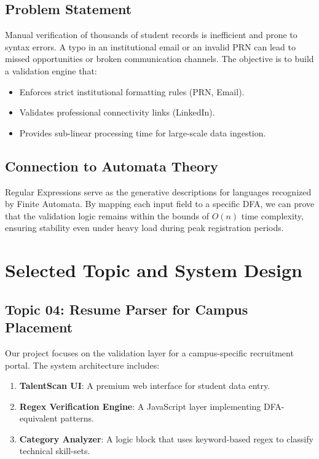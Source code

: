 \documentclass[12pt,a4paper]{article}
\begin{document}
\subsection{Problem Statement}
Manual verification of thousands of student records is inefficient and prone to syntax errors. A typo in an institutional email or an invalid PRN can lead to missed opportunities or broken communication channels. The objective is to build a validation engine that:
\begin{itemize}
    \item Enforces strict institutional formatting rules (PRN, Email).
    \item Validates professional connectivity links (LinkedIn).
    \item Provides sub-linear processing time for large-scale data ingestion.
\end{itemize}

\subsection{Connection to Automata Theory}
Regular Expressions serve as the generative descriptions for languages recognized by Finite Automata. By mapping each input field to a specific DFA, we can prove that the validation logic remains within the bounds of $O(n)$ time complexity, ensuring stability even under heavy load during peak registration periods.

\newpage

\section{Selected Topic and System Design}

\subsection{Topic 04: Resume Parser for Campus Placement}
Our project focuses on the validation layer for a campus-specific recruitment portal. The system architecture includes:
\begin{enumerate}
    \item \textbf{TalentScan UI}: A premium web interface for student data entry.
    \item \textbf{Regex Verification Engine}: A JavaScript layer implementing DFA-equivalent patterns.
    \item \textbf{Category Analyzer}: A logic block that uses keyword-based regex to classify technical skill-sets.
\end{enumerate}
\end{document}
